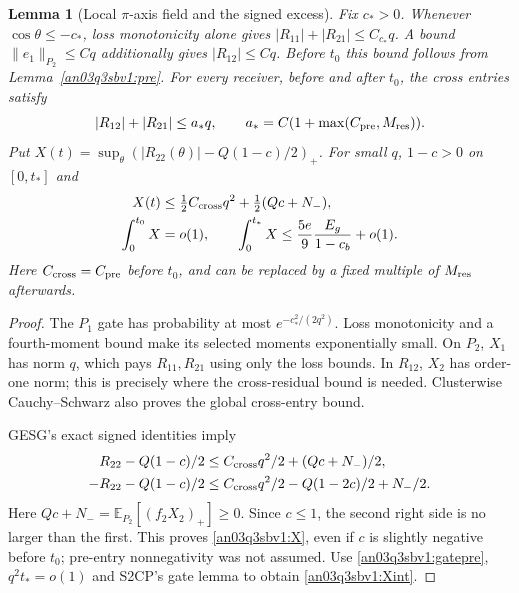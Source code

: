 \documentclass[11pt]{article}
\numberwithin{equation}{section}
\newtheorem{lemma}[proposition]{Lemma}
\theoremstyle{remark}\newtheorem{remark}[proposition]{Remark}
\newcommand{\E}{\mathbb E}
\begin{document}
\begin{lemma}[Local $\pi$-axis field and the signed excess]
\label{an03q3sbv1:local}
Fix $c_*>0$. Whenever $\cos\theta\le-c_*$, loss monotonicity alone
gives $|R_{11}|+|R_{21}|\le C_{c_*}q$. A bound
$\|e_1\|_{P_2}\le Cq$ additionally gives $|R_{12}|\le Cq$.
Before $t_0$ this bound follows from Lemma~\ref{an03q3sbv1:pre}.
For every receiver, before and after $t_0$, the cross entries satisfy
\[
 |R_{12}|+|R_{21}|\le a_*q,\qquad
 a_*=C(1+\max(C_{\rm pre},M_{\rm res})).
\]
Put $X(t)=\sup_\theta(|R_{22}(\theta)|-Q(1-c)/2)_+$.
For small $q$, $1-c>0$ on $[0,t_*]$ and
\begin{align}
 X(t)&\le \tfrac12 C_{\rm cross}q^2
               +\tfrac12(Qc+N_-),                 \label{an03q3sbv1:X}\\
 \int_0^{t_0}X&=o(1),\qquad
 \int_0^{t_*}X\le \frac{5e}{9}\frac{E_g}{1-c_b}+o(1).
                                                     \label{an03q3sbv1:Xint}
\end{align}
Here $C_{\rm cross}=C_{\rm pre}$ before $t_0$, and can be replaced
by a fixed multiple of $M_{\rm res}$ afterwards.
\end{lemma}
\begin{proof}
The $P_1$ gate has probability at most $e^{-c_*^2/(2q^2)}$.
Loss monotonicity and a fourth-moment bound make its selected moments
exponentially small. On $P_2$, $X_1$ has norm $q$, which pays
$R_{11},R_{21}$ using only the loss bounds. In $R_{12}$, $X_2$ has
order-one norm; this is precisely where the cross-residual bound is
needed. Clusterwise Cauchy--Schwarz also proves the global cross-entry
bound.

GESG's exact signed identities imply
\[
 \begin{split}
 R_{22}-Q(1-c)/2
   &\le C_{\rm cross}q^2/2+(Qc+N_-)/2,\\
 -R_{22}-Q(1-c)/2
   &\le C_{\rm cross}q^2/2-Q(1-2c)/2+N_-/2.
 \end{split}
\]
Here $Qc+N_-=\E_{P_2}[(f_2X_2)_+]\ge0$.
Since $c\le1$, the second right side is no larger than the first.
This proves \eqref{an03q3sbv1:X}, even if $c$ is slightly negative
before $t_0$; pre-entry nonnegativity was not assumed.
Use \eqref{an03q3sbv1:gatepre}, $q^2t_*=o(1)$ and S2CP's gate
lemma to obtain \eqref{an03q3sbv1:Xint}.
\end{proof}
\end{document}
